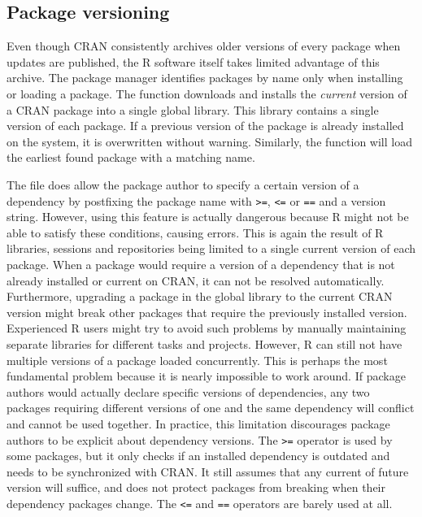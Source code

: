 \subsection{Package versioning}

Even though CRAN consistently archives older versions of every package when
updates are published, the R software itself takes limited advantage of this
archive. The package manager identifies packages by name only when installing
or loading a package. The  function downloads and
installs the \emph{current} version of a CRAN package into a single global
library. This library contains a single version of each package. If a previous
version of the package is already installed on the system, it is overwritten
without warning. Similarly, the  function will load the earliest
found package with a matching name.

The  file does allow the package author to specify a certain
version of a dependency by postfixing the package name with \texttt{>=}, \texttt{<=} or
\texttt{==} and a version string. However, using this feature is actually dangerous
because R might not be able to satisfy these conditions, causing errors. This is
again the result of R libraries, sessions and repositories being limited to a
single current version of each package. When a package would require a version
of a dependency that is not already installed or current on CRAN, it can not be
resolved automatically. Furthermore, upgrading a package in the global library
to the current CRAN version might break other packages that require the
previously installed version. Experienced R users might try to avoid such
problems by manually maintaining separate libraries for different tasks and
projects. However, R can still not have multiple versions of a package loaded
concurrently. This is perhaps the most fundamental problem because it is nearly
impossible to work around. If package authors would actually declare specific
versions of dependencies, any two packages requiring different versions of
one and the same dependency will conflict and cannot be used together. In
practice, this limitation discourages package authors to be explicit about
dependency versions. The \texttt{>=} operator is used by some packages, but
it only checks if an installed dependency is outdated and needs to be
synchronized with CRAN. It still assumes that any current of future version will
suffice, and does not protect packages from breaking when their dependency
packages change. The \texttt{<=} and \texttt{==} operators are barely used at
all.

